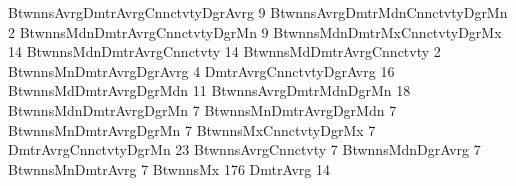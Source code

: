 BtwnnsAvrgDmtrAvrgCnnctvtyDgrAvrg 9
BtwnnsAvrgDmtrMdnCnnctvtyDgrMn 2
BtwnnsMdnDmtrAvrgCnnctvtyDgrMn 9
BtwnnsMdnDmtrMxCnnctvtyDgrMx 14
BtwnnsMdnDmtrAvrgCnnctvty 14
BtwnnsMdDmtrAvrgCnnctvty 2
BtwnnsMnDmtrAvrgDgrAvrg 4
DmtrAvrgCnnctvtyDgrAvrg 16
BtwnnsMdDmtrAvrgDgrMdn 11
BtwnnsAvrgDmtrMdnDgrMn 18
BtwnnsMdnDmtrAvrgDgrMn 7
BtwnnsMnDmtrAvrgDgrMdn 7
BtwnnsMnDmtrAvrgDgrMn 7
BtwnnsMxCnnctvtyDgrMx 7
DmtrAvrgCnnctvtyDgrMn 23
BtwnnsAvrgCnnctvty 7
BtwnnsMdnDgrAvrg 7
BtwnnsMnDmtrAvrg 7
BtwnnsMx 176
DmtrAvrg 14
